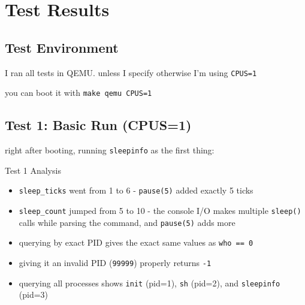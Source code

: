 \documentclass[12pt]{report}
\begin{document}
\chapter{Test Results}

\section{Test Environment}

I ran all tests in QEMU. unless I specify otherwise I'm using \texttt{CPUS=1}

you can boot it with \texttt{make qemu CPUS=1}

\section{Test 1: Basic Run (CPUS=1)}

right after booting, running \texttt{sleepinfo} as the first thing:


\begin{exbox}{Test 1 Analysis}
    \begin{itemize}[noitemsep]
        \item \texttt{sleep\_ticks} went from 1 to 6 - \texttt{pause(5)} added exactly 5 ticks
        \item \texttt{sleep\_count} jumped from 5 to 10 - the console I/O makes multiple \texttt{sleep()} calls while parsing the command, and \texttt{pause(5)} adds more
        \item querying by exact PID gives the exact same values as \texttt{who == 0}
        \item giving it an invalid PID (\texttt{99999}) properly returns \texttt{-1}
        \item querying all processes shows \texttt{init} (pid=1), \texttt{sh} (pid=2), and \texttt{sleepinfo} (pid=3)
    \end{itemize}
\end{exbox}
\end{document}

